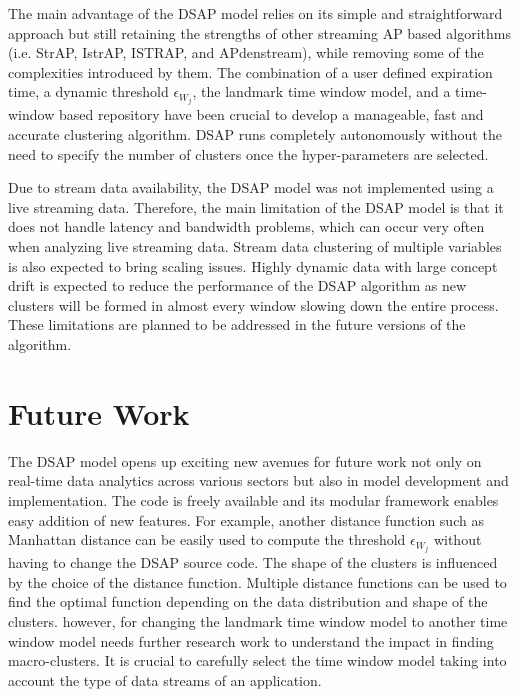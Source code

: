 The main advantage of the DSAP model relies on its simple and straightforward approach but still retaining the strengths of other streaming AP based algorithms (i.e. StrAP, IstrAP, ISTRAP, and APdenstream), while removing some of the complexities introduced by them. The combination of a user defined expiration time, a dynamic threshold $\epsilon_{W_j}$, the landmark time window model, and a time-window based repository have been crucial to develop a manageable, fast and accurate clustering algorithm. DSAP runs completely autonomously without the need to specify the number of clusters once the hyper-parameters are selected. 


Due to stream data availability, the DSAP model was not implemented using a live streaming data. Therefore, the main limitation of the DSAP model is that it does not handle latency and bandwidth problems, which can occur very often when analyzing live streaming data.  Stream data clustering of multiple variables is also expected to bring scaling issues. Highly dynamic data with large concept drift is expected to reduce the performance of the DSAP algorithm as new clusters will be formed in almost every window slowing down the entire process. These limitations are planned to be addressed in the future versions of the algorithm.




\section{Future Work}

The DSAP model opens up exciting new avenues for future work not only on real-time data analytics across various sectors but also in model development and implementation. The code is freely available and its modular framework enables easy addition of new features. For example, another distance function such as Manhattan distance can be easily used to compute the threshold $\epsilon_{W_j}$ without having to change the DSAP source code. The shape of the clusters is influenced by the choice of the distance function. Multiple distance functions can be used to find the optimal function depending on the data distribution and shape of the clusters. however, for changing the landmark time window model to another time window model needs further research work to understand the impact in finding macro-clusters. It is crucial to carefully select the time window model taking into account the type of data streams of an application.

